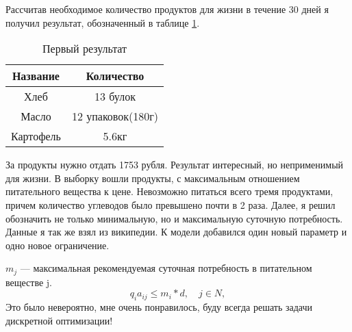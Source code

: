 \documentclass[]{article}
\begin{document}
Рассчитав необходимое количество продуктов для жизни в течение 30 дней я получил результат, обозначенный в таблице \ref{tab:2}.
\begin{table}
	\caption{Первый результат}
	\centering
	\label{tab:2}
	\begin{tabular}{|c|c|}
		\hline
		Название&Количество\\
		\hline
		Хлеб & 13 булок\\
		\hline
		Масло & 12 упаковок(180г)\\
		\hline
		Картофель & 5.6кг\\
		\hline
	\end{tabular}

\end{table}
За продукты нужно отдать 1753 рубля. Результат интересный, но неприменимый для жизни.  В выборку вошли продукты, с
максимальным отношением питательного вещества к цене. Невозможно питаться всего тремя продуктами,
причем количество углеводов было превышено почти в 2 раза. Далее, я решил обозначить не только минимальную,
но и максимальную суточную потребность. Данные я так же взял из википедии. К модели добавился один новый параметр и одно
новое ограничение.
\par\noindent
$m_j$ --- максимальная рекомендуемая суточная потребность в питательном веществе j.
\begin{equation}
	q_ia_{ij} \leq m_i*d,\quad j\in N,
\end{equation}
Это было невероятно, мне очень понравилось, буду всегда решать задачи дискретной оптимизации!
\end{document}
